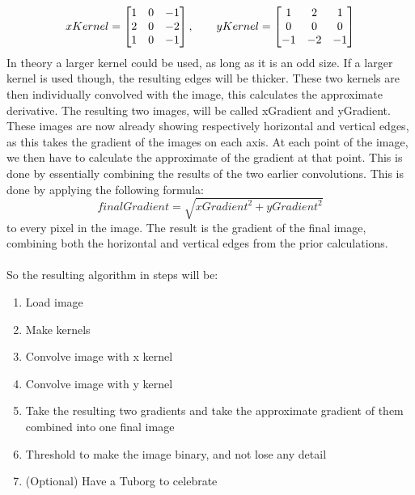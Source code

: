 	\[
	xKernel = 
	\begin{bmatrix}
		1 & 0 & -1\\
		2 & 0 & -2\\
		1 & 0 & -1
	\end{bmatrix},\hspace{0.7cm}
	yKernel = 
	\begin{bmatrix}
	1 & 2 & 1\\
	0 & 0 & 0\\
	-1 & -2 & -1
	\end{bmatrix}
	\]
	In theory a larger kernel could be used, as long as it is an odd size. If a larger kernel is used though, the resulting edges will be thicker.
	These two kernels are then individually convolved with the image, this calculates the approximate derivative. The resulting two images, will be called xGradient and yGradient. These images are now already showing respectively horizontal and vertical edges, as this takes the gradient of the images on each axis.\newpage
	At each point of the image, we then have to calculate the approximate of the gradient at that point. This is done by essentially combining the results of the two earlier convolutions. This is done by applying the following formula:
	\[
	finalGradient = \sqrt{xGradient^2+yGradient^2}
	\]
	to every pixel in the image. The result is the gradient of the final image, combining both the horizontal and vertical edges from the prior calculations.\\
	\\
	So the resulting algorithm in steps will be:
	\begin{enumerate}
		\item Load image
		\item Make kernels
		\item Convolve image with x kernel
		\item Convolve image with y kernel
		\item Take the resulting two gradients and take the approximate gradient of them combined into one final image
		\item Threshold to make the image binary, and not lose any detail
		\item (Optional) Have a Tuborg to celebrate
	\end{enumerate}